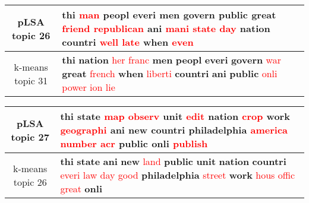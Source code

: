 \begin{center}\begin{tabularx}{\textwidth} {
  | c | >{\raggedright\arraybackslash}X | } \hline 
pLSA topic 26 & \textbf{thi} \textcolor{red}{man} \textbf{peopl} \textbf{everi} \textbf{men} \textbf{govern} \textbf{public} \textbf{great} \textcolor{red}{friend} \textcolor{red}{republican} \textbf{ani} \textcolor{red}{mani} \textcolor{red}{state} \textcolor{red}{day} \textbf{nation} \textbf{countri} \textcolor{red}{well} \textcolor{red}{late} \textbf{when} \textcolor{red}{even} \\ \hline 
k-means topic 31 & \textbf{thi} \textbf{nation} \textcolor{red}{her} \textcolor{red}{franc} \textbf{men} \textbf{peopl} \textbf{everi} \textbf{govern} \textcolor{red}{war} \textbf{great} \textcolor{red}{french} \textbf{when} \textcolor{red}{liberti} \textbf{countri} \textbf{ani} \textbf{public} \textcolor{red}{onli} \textcolor{red}{power} \textcolor{red}{ion} \textcolor{red}{lie} \\ \hline 
\end{tabularx}

\end{center}

\begin{center}\begin{tabularx}{\textwidth} {
  | c | >{\raggedright\arraybackslash}X | } \hline 
pLSA topic 27 & \textbf{thi} \textbf{state} \textcolor{red}{map} \textcolor{red}{observ} \textbf{unit} \textcolor{red}{edit} \textbf{nation} \textcolor{red}{crop} \textbf{work} \textcolor{red}{geographi} \textbf{ani} \textbf{new} \textbf{countri} \textbf{philadelphia} \textcolor{red}{america} \textcolor{red}{number} \textcolor{red}{acr} \textbf{public} \textbf{onli} \textcolor{red}{publish} \\ \hline 
k-means topic 26 & \textbf{thi} \textbf{state} \textbf{ani} \textbf{new} \textcolor{red}{land} \textbf{public} \textbf{unit} \textbf{nation} \textbf{countri} \textcolor{red}{everi} \textcolor{red}{law} \textcolor{red}{day} \textcolor{red}{good} \textbf{philadelphia} \textcolor{red}{street} \textbf{work} \textcolor{red}{hous} \textcolor{red}{offic} \textcolor{red}{great} \textbf{onli} \\ \hline 
\end{tabularx}

\end{center}

